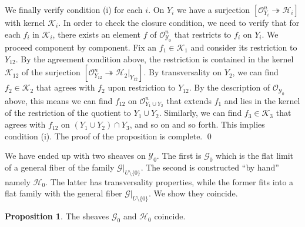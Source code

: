 \documentclass[11pt]{amsart}
\theoremstyle{definition}
\theoremstyle{definition}
\newtheorem{proposition}[theorem]{Proposition}
\newcommand{\cY}{\mathcal{Y}}
\newcommand{\cal}{\mathcal}
\def\cY{{\cal Y}}
\begin{document}
We finally verify condition (i) for each $i$. On $Y_i$ we have a surjection $[\mathcal O_{Y_i}^n\twoheadrightarrow \mathcal H_i]$ with kernel $\mathcal K_i$. In order to check the closure condition, we need to verify that for each $f_i$ in $\mathcal K_i$, there exists an element $f$ of $\mathcal O_{\cY_0}^n$ that restricts to $f_i$ on $Y_i$. We proceed component by component. Fix an $f_1\in \mathcal K_1$ and consider its restriction to $Y_{12}$. By the agreement condition above, the restriction is contained in the kernel $\mathcal K_{12}$ of the surjection $[\mathcal O_{Y_{12}}^n\twoheadrightarrow \mathcal H_2|_{Y_{12}}]$. By transversality on $Y_2$, we can find $f_2\in\mathcal K_2$ that agrees with $f_2$ upon restriction to $Y_{12}$. By the description of $\mathcal O_{\mathcal Y_0}$ above, this means we can find $f_{12}$ on  $\mathcal O_{Y_1\cup Y_2}^n$ that extends $f_1$ and lies in the kernel of the restriction of the quotient to $Y_1\cup Y_2$. Similarly, we can find $f_3\in\mathcal K_3$ that agrees with $f_{12}$ on $(Y_1\cup Y_2)\cap Y_3$, and so on and so forth. This implies condition (i). The proof of the proposition is complete. 
\qed

We have ended up with two sheaves on $\cY_0$. The first is $\mathcal G_0$ which is the flat limit of a general fiber of the family $\mathcal G|_{U\setminus\{0\}}$. The second is constructed ``by hand'' namely $\mathcal H_0$. The latter has transversality properties, while the former fits into a flat family with the general fiber $\mathcal G|_{U\setminus\{0\}}$. We show they coincide. 

\begin{proposition}\label{prop: candidate-is-special-fiber}
The sheaves $\mathcal G_0$ and $\mathcal H_0$ coincide. 
\end{proposition}
\end{document}
